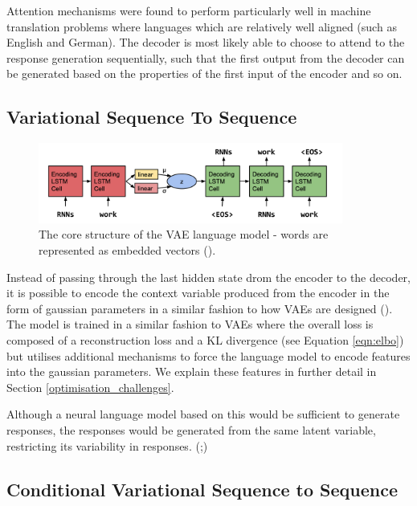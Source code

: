 \documentclass[12pt,twoside]{report}
\begin{document}
Attention mechanisms were found to perform particularly well in machine translation problems where languages which are relatively well aligned (such as English and German). The decoder is most likely able to choose to attend to the response generation sequentially, such that the first output from the decoder can be generated based on the properties of the first input of the encoder and so on.


\subsection{Variational Sequence To Sequence}
\label{variational_context}

\begin{figure}[!ht]
	\centering
	\includegraphics[width=100mm]{diagrams/seq2seqvae.png}
	\caption{The core structure of the VAE language model - words are represented as embedded vectors (\cite{bowman_generating_2015}). \label{vae_seq2seq}}
\end{figure}

Instead of passing through the last hidden state drom the encoder to the decoder, it is possible to encode the context variable produced from the encoder in the form of gaussian parameters in a similar fashion to how VAEs are designed (\cite{bowman_generating_2015}). The model is trained in a similar fashion to VAEs where the overall loss is composed of a reconstruction loss and a KL divergence (see Equation \ref{eqn:elbo}) but utilises additional mechanisms to force the language model to encode features into the gaussian parameters. We explain these features in further detail in Section \ref{optimisation_challenges}.


Although a neural language model based on this would be sufficient to generate responses, the responses would be generated from the same latent variable, restricting its variability in responses. (\cite{zhao_learning_2017};\cite{du_variational_2018})


\subsection{Conditional Variational Sequence to Sequence}
\end{document}
